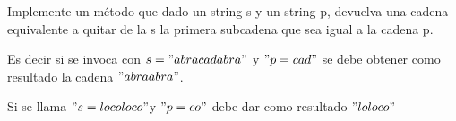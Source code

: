 Implemente un método que dado un string s y un string p, devuelva una 
cadena equivalente a quitar de la s la primera subcadena que sea igual a la cadena p. 

Es decir si se invoca con $s = "abracadabra"$ y $"p = cad"$ se debe obtener como resultado la cadena $"abraabra"$.

Si se llama $"s = locoloco"$y $ "p = co"$ debe dar como resultado $"loloco"$
